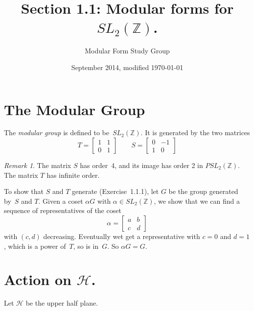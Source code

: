 \documentclass{article}
\theoremstyle{plain}
\theoremstyle{definition}
\theoremstyle{remark}
\newtheorem{remark}[theorem]{Remark}
\newcommand{\Z}{\mathbb{Z}}
\newcommand{\h}{{\mathcal{H}}}
\begin{document}
 

\title{Section 1.1: Modular forms for $SL_2(\Z)$.}

\author{Modular Form Study Group}

\date{September 2014, modified \today}

\maketitle


\section{The Modular Group}

The \emph{modular group} is defined to be~$SL_2(\Z)$.
It is generated by the two matrices
$$
T =
\begin{bmatrix}
1 & 1 \\
0 & 1
\end{bmatrix} 
\qquad
S = \begin{bmatrix}
0 & -1 \\
1 & 0
\end{bmatrix} 
$$

\begin{remark}
The matrix $S$ has order~4, and its image has order 2 in $PSL_2(\Z)$.
The matrix $T$ has infinite order.

To show that $S$ and $T$ generate (Exercise~1.1.1), let $G$ be the group generated by~$S$
and $T$. 
Given a coset $\alpha G$ with $\alpha \in SL_2(\Z)$, we show that
we can find a sequence of representatives of the coset 
$$
\alpha = \begin{bmatrix}
a & b \\
c & d
\end{bmatrix} 
$$
with $(c, d)$ decreasing. Eventually wet get a representative with $c = 0$
and $d = 1$, which is a power of~$T$, so is in~$G$. So $\alpha G = G$.
\end{remark}


\section{Action on $\h$.}

Let $\h$ be the upper half plane.
\end{document}

